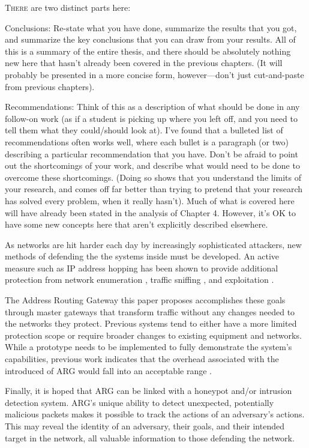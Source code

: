 \lettrine{T}{here} are two distinct parts here:

\par Conclusions: Re-state what you have done, summarize the results that you got,
and summarize the key conclusions that you can draw from your results. All of
this is a summary of the entire thesis, and there should be absolutely nothing new
here that hasn’t already been covered in the previous chapters. (It will probably
be presented in a more concise form, however—don’t just cut-and-paste from
previous chapters).

\par Recommendations: Think of this as a description of what should be done in any
follow-on work (as if a student is picking up where you left off, and you need to
tell them what they could/should look at). I’ve found that a bulleted list of
recommendations often works well, where each bullet is a paragraph (or two)
describing a particular recommendation that you have. Don’t be afraid to point
out the shortcomings of your work, and describe what would need to be done to
overcome these shortcomings. (Doing so shows that you understand the limits of
your research, and comes off far better than trying to pretend that your research
has solved every problem, when it really hasn’t). Much of what is covered here
will have already been stated in the analysis of Chapter 4. However, it’s OK to
have some new concepts here that aren’t explicitly described elsewhere.

\par As networks are hit harder each day by increasingly sophisticated attackers, new methods of defending the the systems inside must be developed. An active measure such as IP address hopping has been shown to provide additional protection from network enumeration \cite{NAH}, traffic sniffing \cite{BBNDYNAT}, and exploitation \cite{APOD}.

\par The Address Routing Gateway this paper proposes accomplishes these goals through master gateways that transform traffic without any changes needed to the networks they protect. Previous systems tend to either have a more limited protection scope or require broader changes to existing equipment and networks. While a prototype needs to be implemented to fully demonstrate the system's capabilities, previous work indicates that the overhead associated with the introduced of ARG would fall into an acceptable range \cite{NAH}.

\par Finally, it is hoped that ARG can be linked with a honeypot and/or intrusion detection system. ARG's unique ability to detect unexpected, potentially malicious packets makes it possible to track the actions of an adversary's actions. This may reveal the identity of an adversary, their goals, and their intended target in the network, all valuable information to those defending the network.

